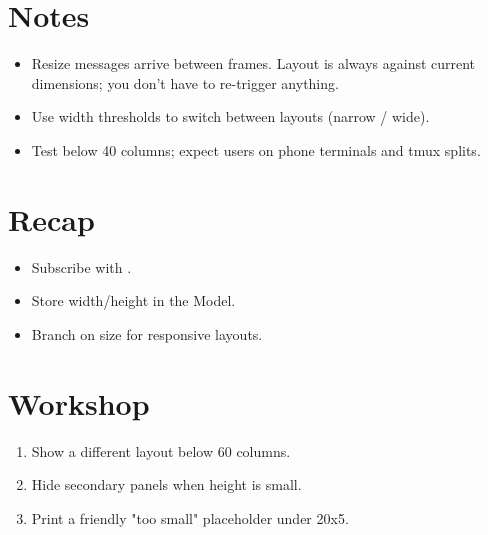 \section{Notes}

\begin{itemize}[leftmargin=*]
  \item Resize messages arrive between frames. Layout is
    always against current dimensions; you don't have to
    re-trigger anything.
  \item Use width thresholds to switch between layouts
    (narrow / wide).
  \item Test below 40 columns; expect users on phone
    terminals and tmux splits.
\end{itemize}

\section{Recap}

\begin{recap}
\begin{itemize}[leftmargin=*]
  \item Subscribe with .
  \item Store width/height in the Model.
  \item Branch  on size for responsive layouts.
\end{itemize}
\end{recap}

\section*{Workshop}

\begin{enumerate}[leftmargin=*]
  \item Show a different layout below 60 columns.
  \item Hide secondary panels when height is small.
  \item Print a friendly "too small" placeholder under
    20x5.
\end{enumerate}
